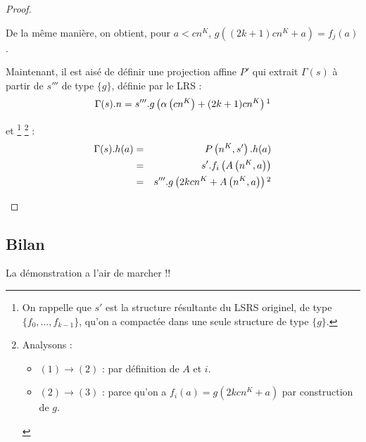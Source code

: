 \begin{proof}
\begin{enumerate}[itemsep=-1mm,leftmargin=2cm]
					De la même manière, on obtient, pour $a < cn^K$, $g\left( (2k+1)cn^K + a\right) = f_j(a)$. 
					
					Maintenant, il est aisé de définir une projection affine $P'$ qui extrait $\Gamma(s)$ à partir de $s'''$ de type $\{g\}$, définie par le LRS :
					\[
						\Gamma(s).n = s'''.g\left( \alpha\left( cn^K\right) + (2k+1)cn^K\right) \footnotemark
					\]
					
					
					et
						\footnote{On rappelle que $s'$ est la structure résultante du LSRS originel, de type $\{f_0, \dots, f_{k-1}\}$, qu'on a compactée dans une seule structure de type $\{g\}$.}
						\footnote{Analysons :
							\begin{itemize}
								\setlength{\itemsep}{-1mm}
								\item 	$(1) \rightarrow (2)$ : par définition de $A$ et $i$.
								\item 	$(2) \rightarrow (3)$ : parce qu'on a $f_i(a) = g\left( 2kcn^K + a \right)$ par construction de $g$.
							\end{itemize}
							}
					 :
					\setcounter{equation}{0}
					\begin{eqnarray}
						\Gamma(s).h(a) 	& = &	P\left( n^K, s' \right).h(a) \\
										& = &	s'.f_i\left( A\left( n^K, a \right) \right) \\
										& = & 	s'''.g\left( 2kcn^K + A\left( n^K, a \right) \right) \footnotemark
					\end{eqnarray}
					
					
			\end{enumerate}
			
		
	\end{proof}
	
		
		\subsection{Bilan}
		La démonstration a l'air de marcher !!
		

	\pagebreak
		
